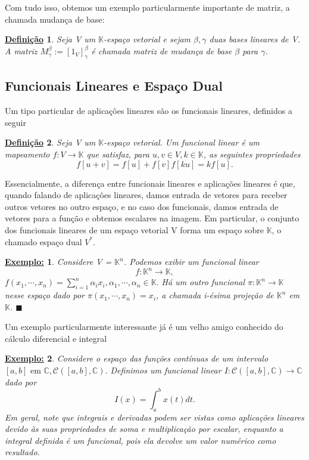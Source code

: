 \documentclass{article}
\newtheorem*{def*}{\underline{Defini\c c\~ao}}
\newtheorem{example}{\underline{Exemplo:}}[section]
\renewcommand\qedsymbol{$\blacksquare$}
\begin{document}
Com tudo isso, obtemos um exemplo particularmente importante de matriz, a chamada mudan\c ca de base:
\begin{def*}
	Seja V um $\mathbb{K}$-espa\c co vetorial e sejam $\beta, \gamma$ duas bases lineares de V. A matriz
	$M_\gamma^{\beta} := [1_V]_{\gamma}^{\beta}$ \'e chamada matriz de mudan\c ca de base $\beta$ para $\gamma$.
\end{def*}

\subsection{Funcionais Lineares e Espa\c co Dual}
Um tipo particular de aplica\c c\~oes lineares s\~ao os funcionais lineares, definidos a seguir
\begin{def*}
	Seja V um $\mathbb{K}$-espa\c co vetorial. Um funcional linear \'e um mapeamento $f: V\rightarrow{\mathbb{K}}$
	que satisfaz, para $u, v\in{V}, k\in\mathbb{K}$, as seguintes propriedades
	$$
		f[u + v] = f[u] + f[v]
		f[ku] = kf[u].
	$$
\end{def*}
Essencialmente, a diferen\c ca entre funcionais lineares e aplica\c c\~oes lineares \'e que, quando falando de
aplica\c c\~oes lineares, damos entrada de vetores para receber outros vetores no outro espa\c co, e no caso dos
funcionais, damos entrada de vetores para a fun\c c\~ao e obtemos escalares na imagem.
Em particular, o conjunto dos funcionais lineares de um espa\c co vetorial V forma um espa\c co sobre $\mathbb{K}$,
o chamado espa\c co dual $V^*$.
\begin{example}
	Considere V = $\mathbb{K}^n$. Podemos exibir um funcional linear
	$$
		f: \mathbb{K}^n\rightarrow{\mathbb{K}},
	$$
	$f(x_1, \cdots, x_n) = \sum\limits_{i=1}^{n}\alpha_ix_i, \alpha_1, \cdots, \alpha_n\in{\mathbb{K}}.$ H\'a um outro
	funcional $\pi: \mathbb{K}^{n}\rightarrow\mathbb{K}$ nesse espa\c co dado por $\pi(x_1, \cdots, x_n) = x_i$, a chamada
	i-\'esima proje\c c\~ao de $\mathbb{K}^{n}$ em $\mathbb{K}$.
	\qedsymbol
\end{example}
Um exemplo particularmente interessante j\'a \'e um velho amigo conhecido do c\'alculo diferencial e integral
\begin{example}
	Considere o espa\c co das fun\c c\~oes cont\'inuas de um intervalo $[a, b] \text{ em } \mathbb{C},
		\mathcal{C}([a, b], \mathbb{C}).$ Definimos um funcional linear $I:\mathcal{C}([a, b], \mathbb{C})\rightarrow
		\mathbb{C}$ dado por
	$$
		I(x) = \int_a^b x(t)dt.
	$$
	Em geral, note que integrais e derivadas podem ser vistas como aplica\c c\~oes lineares devido \`as suas propriedades
	de soma e multiplica\c c\~ao por escalar, enquanto a integral definida \'e um funcional, pois ela devolve um valor
	num\'erico como resultado.
\end{example}
\end{document}

